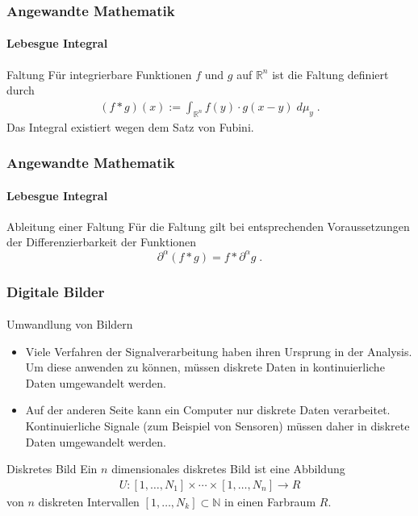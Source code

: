 \documentclass{beamer}
\begin{document}
\begin{frame}
    \frametitle{Angewandte Mathematik}
\framesubtitle{Lebesgue Integral}
\begin{block}{Faltung}
Für integrierbare Funktionen  $f$ und $g$ auf $\mathbb{R}^n$ ist die Faltung definiert durch
\begin{align}
(f * g )(x) := \int_{\mathbb{R}^n}  f(y) \cdot g(x-y) \; d \mu_y  \; .
\end{align}
Das Integral existiert wegen dem Satz von Fubini.
\end{block}
 \end{frame}





\begin{frame}
    \frametitle{Angewandte Mathematik}
\framesubtitle{Lebesgue Integral}
\begin{block}{Ableitung einer Faltung}
Für die Faltung gilt bei entsprechenden Voraussetzungen der Differenzierbarkeit der Funktionen 
$$ \partial^{\alpha} (f  * g) = f * \partial^{\alpha} g \; .$$
\end{block}
 \end{frame}





\begin{frame}
    \frametitle{Digitale Bilder}
\framesubtitle{}
    \begin{block}{Umwandlung von Bildern}
\begin{itemize}
\item Viele Verfahren der  Signalverarbeitung haben ihren Ursprung in der Analysis. Um diese anwenden zu können, müssen diskrete Daten  in kontinuierliche Daten umgewandelt werden.
\item Auf der anderen Seite kann  ein Computer nur diskrete Daten  verarbeitet. Kontinuierliche Signale (zum Beispiel von Sensoren) müssen daher in diskrete Daten umgewandelt werden.
\end{itemize}
\end{block}

 \end{frame}



   \begin{block}{Diskretes Bild}
Ein $n$ dimensionales diskretes Bild ist eine Abbildung 
\begin{align*}
U : [1, \ldots, N_1] \times   \cdots \times [1, \ldots, N_n]   \to R
\end{align*}
von $n$ diskreten Intervallen  $[1, \ldots, N_k]  \subset \mathbb{N}$  in einen Farbraum $R$.
\end{block}
\end{document}

